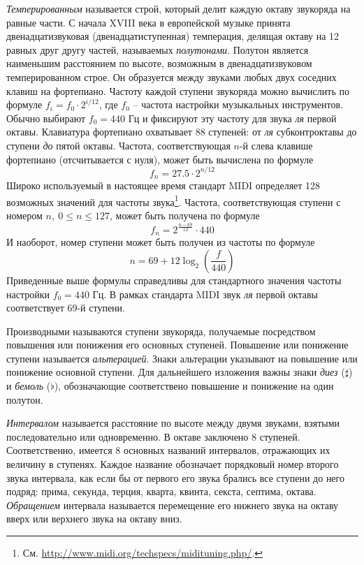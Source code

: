 \emph{Темперированным} называется строй, который делит каждую октаву звукоряда
на равные части. С начала XVIII века в европейской музыке принята
двенадцатизвуковая (двенадцатиступенная) темперация, делящая октаву на 12 равных
друг другу частей, называемых \emph{полутонами}. Полутон является наименьшим
расстоянием по высоте, возможным в двенадцатизвуковом темперированном строе. Он
образуется между звуками любых двух соседних клавиш на фортепиано. Частоту
каждой ступени звукоряда можно вычислить по формуле $f_i = f_0 \cdot 2^{i/12}$,
где $f_0$ -- частота настройки музыкальных инструментов. Обычно выбирают $f_0 =
440$ Гц и фиксируют эту частоту для звука \emph{ля} первой октавы. Клавиатура
фортепиано охватывает 88 ступеней: от \emph{ля} субконтроктавы до
ступени \emph{до} пятой октавы. Частота, соответствующая $n$-й слева клавише
фортепиано (отсчитывается с нуля), может быть вычислена по формуле
$$f_n = 27.5 \cdot 2^{n/12}$$
Широко используемый в настоящее время стандарт MIDI определяет 128 возможных
значений для частоты звука\footnote{См.
\url{http://www.midi.org/techspecs/midituning.php/}.}. Частота, соответствующая
ступени с номером $n,~0 \leq n \leq 127$, может быть получена по формуле
$$f_n = 2^{\frac{n-69}{12}} \cdot 440$$
И наоборот, номер ступени может быть получен из частоты по формуле
\begin{equation}
\label{eq:fton}
n = 69 + 12 \log_2 \left( \frac{f}{440} \right)
\end{equation}
Приведенные выше формулы справедливы для стандартного значения частоты
настройки $f_0 = 440$ Гц. В рамках стандарта MIDI звук \emph{ля} первой октавы
соответствует 69-й ступени.

Производными называются ступени звукоряда, получаемые посредством повышения или
понижения его основных ступеней. Повышение или понижение ступени называется
\emph{альтерацией}. Знаки альтерации указывают на повышение или понижение
основной ступени. Для дальнейшего изложения важны знаки \emph{диез} ($\sharp$) и
\emph{бемоль} ($\flat$), обозначающие соответствено повышение и понижение на
один полутон.

\emph{Интервалом} называется расстояние по высоте между двумя звуками, взятыми
последовательно или одновременно. В октаве заключено 8 ступеней. Соответственно,
имеется 8 основных названий интервалов, отражающих их величину в ступенях.
Каждое название обозначает порядковый номер второго звука интервала, как если бы
от первого его звука брались все ступени до него подряд: прима, секунда, терция,
кварта, квинта, секста, септима, октава. \emph{Обращением} интервала называется
перемещение его нижнего звука на октаву вверх или верхнего звука на октаву вниз.

